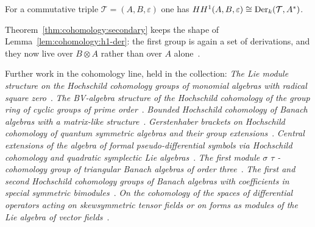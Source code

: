 \begin{theorem}\label{thm:cohomology:secondary}
For a commutative triple $\mathcal{T} = (A, B, \varepsilon)$ one has
$HH^1(A, B, \varepsilon) \cong \operatorname{Der}_k(\mathcal{T}, A^*)$.
\end{theorem}

Theorem~\ref{thm:cohomology:secondary} keeps the shape of
Lemma~\ref{lem:cohomology:h1-der}: the first group is again a set of
derivations, and they now live over $B\otimes A$ rather than over $A$
alone~\cite[Theorem~3.6, pp.~5--6]{BennettHeilLaubacher2023}.

Further work in the cohomology line, held in the collection:
\noindent\emph{The Lie module structure on the Hochschild cohomology groups of
monomial algebras with radical square
zero}~\cite{LibTheLieModuleStructure2008}. \noindent\emph{The BV-algebra
structure of the Hochschild cohomology of the group ring of cyclic groups of
prime order}~\cite{LibTheBvAlgebraStructure2016}. \noindent\emph{Bounded
Hochschild cohomology of Banach algebras with a matrix-like
structure}~\cite{LibBoundedHochschildCohomologyOf2006}.
\noindent\emph{Gerstenhaber brackets on Hochschild cohomology of quantum
symmetric algebras and their group
extensions}~\cite{LibGerstenhaberBracketsOnHochschild2016}.
\noindent\emph{Central extensions of the algebra of formal pseudo-differential
symbols via Hochschild cohomology and quadratic symplectic Lie
algebras}~\cite{LibCentralExtensionsOfThe2018}. \noindent\emph{The first
module $\sigma$ $\tau$ -cohomology group of triangular Banach algebras of
order three}~\cite{LibTheFirstModuleCohomology2018}. \noindent\emph{The first
and second Hochschild cohomology groups of Banach algebras with coefficients
in special symmetric bimodules}~\cite{LibTheFirstAndSecond2020}.
\noindent\emph{On the cohomology of the spaces of differential operators
acting on skewsymmetric tensor fields or on forms as modules of the Lie
algebra of vector fields}~\cite{LibOnTheCohomologyOf2004}.
